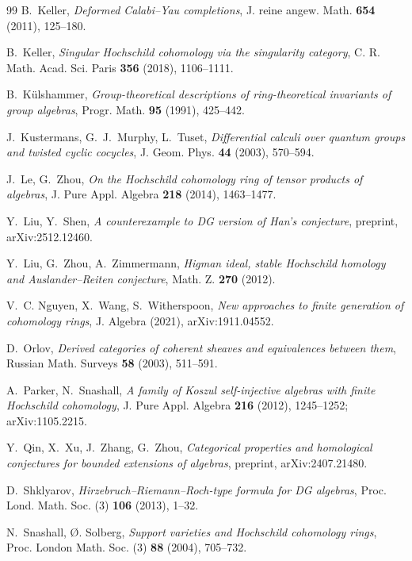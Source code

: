 \documentclass[11pt]{amsart}
\theoremstyle{definition}
\begin{document}
\begin{thebibliography}{99}
 B.~Keller, \emph{Deformed Calabi--Yau completions}, J.
reine angew. Math. \textbf{654} (2011), 125--180.

 B.~Keller, \emph{Singular Hochschild cohomology via the
singularity category}, C. R. Math. Acad. Sci. Paris \textbf{356} (2018),
1106--1111.

 B.~K\"ulshammer, \emph{Group-theoretical descriptions of
ring-theoretical invariants of group algebras}, Progr. Math. \textbf{95}
(1991), 425--442.

 J.~Kustermans, G.~J.~Murphy, L.~Tuset, \emph{Differential calculi
over quantum groups and twisted cyclic cocycles}, J. Geom. Phys. \textbf{44}
(2003), 570--594.

 J.~Le, G.~Zhou, \emph{On the Hochschild cohomology ring of
tensor products of algebras}, J. Pure Appl. Algebra \textbf{218} (2014),
1463--1477.

 Y.~Liu, Y.~Shen, \emph{A counterexample to DG version
of Han's conjecture}, preprint, arXiv:2512.12460.

 Y.~Liu, G.~Zhou, A.~Zimmermann, \emph{Higman ideal,
stable Hochschild homology and Auslander--Reiten conjecture}, Math. Z.
\textbf{270} (2012).

 V.~C. Nguyen, X.~Wang, S.~Witherspoon, \emph{New approaches to
finite generation of cohomology rings}, J. Algebra (2021), arXiv:1911.04552.

 D.~Orlov, \emph{Derived categories of coherent sheaves
and equivalences between them}, Russian Math. Surveys \textbf{58} (2003),
511--591.

 A.~Parker, N.~Snashall, \emph{A family of Koszul
self-injective algebras with finite Hochschild cohomology}, J. Pure Appl.
Algebra \textbf{216} (2012), 1245--1252; arXiv:1105.2215.

 Y.~Qin, X.~Xu, J.~Zhang, G.~Zhou, \emph{Categorical properties
and homological conjectures for bounded extensions of algebras}, preprint,
arXiv:2407.21480.

 D.~Shklyarov, \emph{Hirzebruch--Riemann--Roch-type
formula for DG algebras}, Proc. Lond. Math. Soc. (3) \textbf{106} (2013),
1--32.

 N.~Snashall, \O. Solberg, \emph{Support varieties
and Hochschild cohomology rings}, Proc. London Math. Soc. (3) \textbf{88}
(2004), 705--732.


\end{thebibliography}
\end{document}
